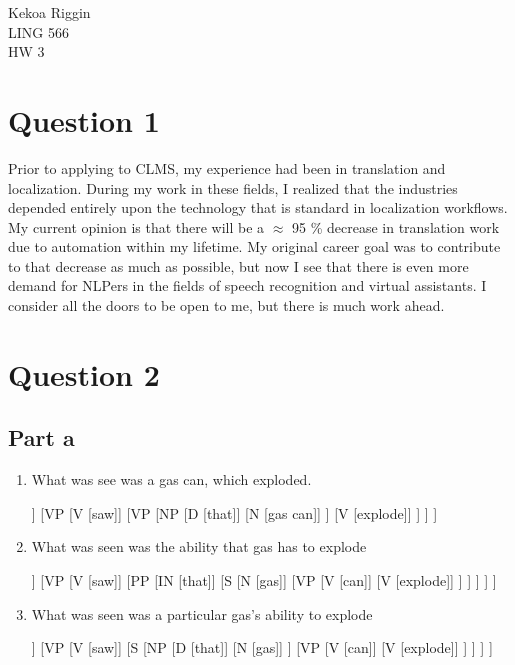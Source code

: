 \documentclass[10pt]{article}
\begin{document}
\noindent
Kekoa Riggin\\
LING 566\\
HW 3

\section*{Question 1}
\noindent
Prior to applying to CLMS, my experience had been in translation and localization. During my work in these fields, I realized that the industries depended entirely upon the technology that is standard in localization workflows. My current opinion is that there will be a $\approx$ 95 \% decrease in translation work due to automation within my lifetime. My original career goal was to contribute to that decrease as much as possible, but now I see that there is even more demand for NLPers in the fields of speech recognition and virtual assistants. I consider all the doors to be open to me, but there is much work ahead. 

\section*{Question 2}

\subsection*{Part a}
\noindent
\begin{enumerate}
\item
What was see was a gas can, which exploded.

\begin{forest}
	[S
		[N [I]]
		[VP 
			[V [saw]]
			[VP
				[NP
					[D [that]]
					[N [gas can]]
				]
				[V [explode]]
			]
		]
	]
\end{forest}

\item 
What was seen was the ability that gas has to explode

\begin{forest}
	[S
		[N [I]]
		[VP 
			[V [saw]]
			[PP
				[IN [that]]
				[S
					[N [gas]]
					[VP 
						[V [can]]
						[V [explode]]
					]
				]
			]
		]
	]
\end{forest}

\item
What was seen was a particular gas's ability to explode

\begin{forest}
	[S
		[N [I]]
		[VP 
			[V [saw]]
			[S
				[NP
					[D [that]]
					[N [gas]]
				]					
				[VP
					[V [can]]
					[V [explode]]
				]
			]
		]
	]
\end{forest}

\end{enumerate}
\end{document}
